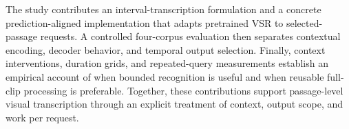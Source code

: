 The study contributes an interval-transcription formulation and a concrete
prediction-aligned implementation that adapts pretrained VSR to selected-passage
requests. A controlled four-corpus evaluation then separates contextual encoding,
decoder behavior, and temporal output selection. Finally, context interventions,
duration grids, and repeated-query measurements establish an empirical account
of when bounded recognition is useful and when reusable full-clip processing
is preferable. Together, these contributions support passage-level visual
transcription through an explicit treatment of context, output scope, and work
per request.
